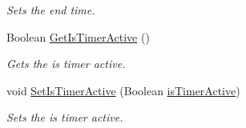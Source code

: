 \begin{DoxyCompactItemize}
\begin{DoxyCompactList}\small\item\em Sets the end time. \end{DoxyCompactList}\item 
Boolean \hyperlink{classcom_1_1shephertz_1_1app42_1_1paas_1_1sdk_1_1csharp_1_1timer_1_1_timer_a185b6dac6d706362f88a5f67e54bd9ce}{Get\+Is\+Timer\+Active} ()
\begin{DoxyCompactList}\small\item\em Gets the is timer active. \end{DoxyCompactList}\item 
void \hyperlink{classcom_1_1shephertz_1_1app42_1_1paas_1_1sdk_1_1csharp_1_1timer_1_1_timer_a06297daaeec582d1849841fcf3e92e4f}{Set\+Is\+Timer\+Active} (Boolean \hyperlink{classcom_1_1shephertz_1_1app42_1_1paas_1_1sdk_1_1csharp_1_1timer_1_1_timer_a6e75c88965a37bb7fdf9cc1f73f505dd}{is\+Timer\+Active})
\begin{DoxyCompactList}\small\item\em Sets the is timer active. \end{DoxyCompactList}\end{DoxyCompactItemize}
